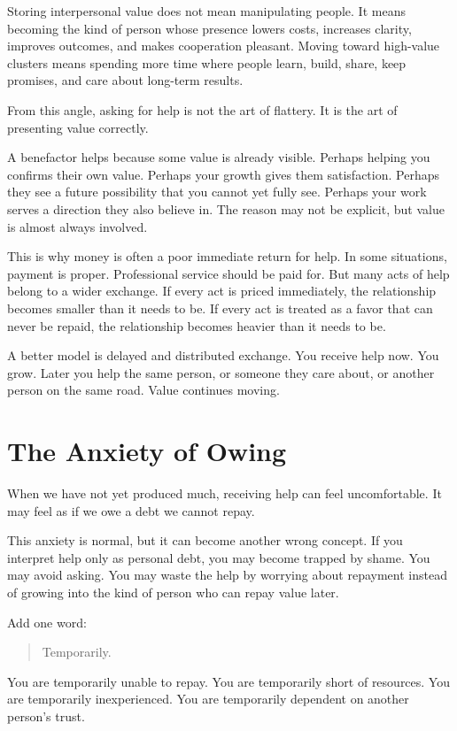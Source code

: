 Storing interpersonal value does not mean manipulating people. It means becoming the kind of person whose presence lowers costs, increases clarity, improves outcomes, and makes cooperation pleasant. Moving toward high-value clusters means spending more time where people learn, build, share, keep promises, and care about long-term results.

From this angle, asking for help is not the art of flattery. It is the art of presenting value correctly.

A benefactor helps because some value is already visible. Perhaps helping you confirms their own value. Perhaps your growth gives them satisfaction. Perhaps they see a future possibility that you cannot yet fully see. Perhaps your work serves a direction they also believe in. The reason may not be explicit, but value is almost always involved.

This is why money is often a poor immediate return for help. In some situations, payment is proper. Professional service should be paid for. But many acts of help belong to a wider exchange. If every act is priced immediately, the relationship becomes smaller than it needs to be. If every act is treated as a favor that can never be repaid, the relationship becomes heavier than it needs to be.

A better model is delayed and distributed exchange. You receive help now. You grow. Later you help the same person, or someone they care about, or another person on the same road. Value continues moving.

\section*{The Anxiety of Owing}

When we have not yet produced much, receiving help can feel uncomfortable. It may feel as if we owe a debt we cannot repay.

This anxiety is normal, but it can become another wrong concept. If you interpret help only as personal debt, you may become trapped by shame. You may avoid asking. You may waste the help by worrying about repayment instead of growing into the kind of person who can repay value later.

Add one word:

\begin{quote}
Temporarily.
\end{quote}

You are temporarily unable to repay. You are temporarily short of resources. You are temporarily inexperienced. You are temporarily dependent on another person's trust.

